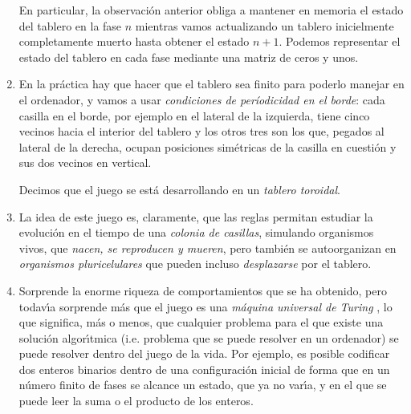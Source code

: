 \begin{enumerate}
 En particular, la observaci\'on anterior obliga a mantener en memoria el estado
del tablero en la fase $n$ mientras vamos actualizando un tablero inicielmente
completamente muerto hasta obtener el estado $n+1$.  Podemos representar el
estado del tablero en cada fase mediante una matriz de ceros y unos.
 
 
\item En la pr\'actica hay que hacer que el tablero sea finito para poderlo
manejar en el ordenador, y  vamos a usar {\itshape condiciones de 
per\'iodicidad en el
borde}: cada casilla en el borde, por ejemplo en el lateral de la izquierda,
tiene cinco vecinos hacia el interior del tablero y los otros tres son los que,
pegados al lateral de la derecha, ocupan posiciones sim\'etricas de la casilla
en cuesti\'on y sus dos vecinos en vertical. 

Decimos que el juego se est\'a desarrollando en un {\itshape tablero toroidal}.
 
\item La idea de este juego es, claramente, que las reglas permitan estudiar la
evoluci\'on en el tiempo de una {\itshape colonia de casillas}, simulando 
organismos
vivos,  que {\itshape nacen, se reproducen  y mueren},  pero tambi\'en se 
autoorganizan en
{\itshape organismos pluricelulares} que pueden incluso {\itshape desplazarse} 
por el tablero.
 

\item Sorprende la enorme riqueza de comportamientos que se ha obtenido, pero
todav\'{\i}a sorprende m\'as que el juego es una {\itshape m\'aquina universal 
de
Turing} , lo que significa, m\'as o menos, que cualquier problema para el que
existe una soluci\'on algor\'{\i}tmica (i.e. problema que se puede resolver en
un ordenador) se puede resolver dentro del juego de la vida. Por ejemplo, es
posible codificar dos enteros binarios dentro de una configuraci\'on inicial de
forma que en un n\'umero finito de fases se alcance un estado, que ya no
var\'{\i}a,  y en el que se puede leer la suma o el producto de los enteros.
\end{enumerate}


